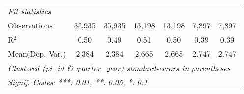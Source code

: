 \begin{tabular}{lcccccc}
   \midrule
   \emph{Fit statistics}\\
   Observations                                                & 35,935        & 35,935        & 13,198         & 13,198        & 7,897         & 7,897\\  
   R$^2$                                                       & 0.50          & 0.49          & 0.51           & 0.50          & 0.39          & 0.39\\  
Mean(Dep. Var.) & 2.384 & 2.384 & 2.665 & 2.665 & 2.747 & 2.747 \\
   \midrule \midrule
   \multicolumn{7}{l}{\emph{Clustered (pi\_id \& quarter\_year) standard-errors in parentheses}}\\
   \multicolumn{7}{l}{\emph{Signif. Codes: ***: 0.01, **: 0.05, *: 0.1}}\\
\end{tabular}
\par\endgroup
